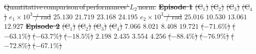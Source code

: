 \documentclass[letterpaper, journal]{IEEEtran}
\providecommand{\DIFdel}[1]{{\protect\color{red}\sout{#1}}} %
\providecommand{\DIFaddbegin}{} %
\providecommand{\DIFaddend}{} %
\providecommand{\DIFdelbegin}{} %
\providecommand{\DIFdelend}{} %
\providecommand{\DIFdelFL}[1]{\DIFdel{#1}} %
\begin{document}
\DIFdelbegin %
{%
\DIFdelFL{Quantitative\,comparison\,of\,performances'\,$L_2$\,norm.}}
{%
\textbf{\DIFdelFL{Episode 1}}%
} %
\DIFdelFL{(C$_1$) }%
\DIFdelFL{(C$_2$) }%
\DIFdelFL{(C$_3$) }%
\DIFdelFL{(C$_4$) }%
\DIFdelFL{$e_1\times10^{3}$ / rad }%
\DIFdelFL{$25.130$ }%
\DIFdelFL{$21.719$ }%
\DIFdelFL{$23.168$ }%
\DIFdelFL{$24.195$ }%
\DIFdelFL{$e_2\times10^{3}$ / rad }%
\DIFdelFL{$25.016$ }%
\DIFdelFL{$10.530$ }%
\DIFdelFL{$13.061$ }%
\DIFdelFL{$12.927$ }%
{%
\textbf{\DIFdelFL{Episode 2}}%
} %
\DIFdelFL{(C$_1$) }%
\DIFdelFL{(C$_2$) }%
\DIFdelFL{(C$_3$) }%
\DIFdelFL{(C$_4$) }%
\DIFdelFL{$7.066$ }%
\DIFdelFL{$8.021$ }%
\DIFdelFL{$8.408$ }%
\DIFdelFL{$19.721$ }%
\DIFdelFL{($-71.6\%$) }%
\DIFdelFL{($-63.1\%$) }%
\DIFdelFL{($-63.7\%$) }%
\DIFdelFL{($-18.5\%$) }%
\DIFdelFL{$2.198$ }%
\DIFdelFL{$2.435$ }%
\DIFdelFL{$3.554$ }%
\DIFdelFL{$4.256$ }%
\DIFdelFL{($-88.4\%$) }%
\DIFdelFL{($-76.9\%$) }%
\DIFdelFL{($-72.8\%$) }%
\DIFdelFL{($-67.1\%$) }%
\DIFdelend \DIFaddbegin {}
\DIFaddend 
\end{document}
